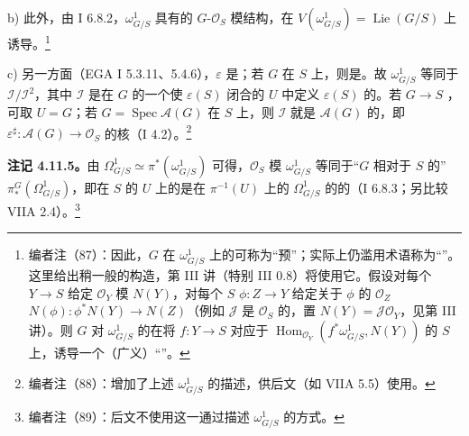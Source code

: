 b) 此外，由 I 6.8.2，$\omega^1_{G/S}$ 具有的 $G$-$\mathcal O_S$ 模结构，在 $V(\omega^1_{G/S})=\operatorname{Lie}(G/S)$ 上诱导。\footnote{编者注（87）：因此，$G$ 在 $\omega^1_{G/S}$ 上的可称为“预”；实际上仍滥用术语称为“”。这里给出稍一般的构造，第 III 讲（特别 III 0.8）将使用它。假设对每个 $Y\to S$ 给定 $\mathcal O_Y$ 模 $N(Y)$，对每个 $S$  $\phi:Z\to Y$ 给定关于 $\phi$ 的 $\mathcal O_Z$  $N(\phi):\phi^*N(Y)\to N(Z)$（例如 $\mathcal J$ 是 $\mathcal O_S$ 的，置 $N(Y)=\mathcal J\mathcal O_Y$，见第 III 讲）。则 $G$ 对 $\omega^1_{G/S}$ 的在将 $f:Y\to S$ 对应于 $\operatorname{Hom}_{\mathcal O_Y}(f^*\omega^1_{G/S},N(Y))$ 的 $S$ 上，诱导一个（广义）“”。}

c) 另一方面（EGA I 5.3.11、5.4.6），$\varepsilon$ 是；若 $G$ 在 $S$ 上，则是。故 $\omega^1_{G/S}$ 等同于 $\mathcal I/\mathcal I^2$，其中 $\mathcal I$ 是在 $G$ 的一个使 $\varepsilon(S)$ 闭合的 $U$ 中定义 $\varepsilon(S)$ 的。若 $G\to S$ ，可取 $U=G$；若 $G=\operatorname{Spec}\mathcal A(G)$ 在 $S$ 上，则 $\mathcal I$ 就是 $\mathcal A(G)$ 的，即 $\varepsilon^\sharp:\mathcal A(G)\to\mathcal O_S$ 的核（I 4.2）。\footnote{编者注（88）：增加了上述 $\omega^1_{G/S}$ 的描述，供后文（如 VIIA 5.5）使用。}

\textbf{注记 4.11.5。}由 $\Omega^1_{G/S}\simeq\pi^*(\omega^1_{G/S})$ 可得，$\mathcal O_S$ 模 $\omega^1_{G/S}$ 等同于“$G$ 相对于 $S$ 的” $\pi_*^G(\Omega^1_{G/S})$，即在 $S$ 的 $U$ 上的是在 $\pi^{-1}(U)$ 上的 $\Omega^1_{G/S}$ 的的（I 6.8.3；另比较 VIIA 2.4）。\footnote{编者注（89）：后文不使用这一通过描述 $\omega^1_{G/S}$ 的方式。}

